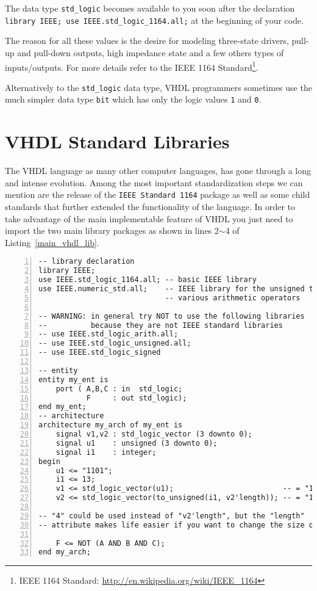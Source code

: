 The data type \texttt{std\_logic} becomes available to you soon after the declaration \texttt{library IEEE; use IEEE.std\_logic\_1164.all;} at the beginning of your code.

The reason for all these values is the desire for modeling three-state drivers, pull-up and pull-down outputs, high impedance state and a few others types of inputs/outputs. For more details refer to the IEEE 1164 Standard\footnote{IEEE 1164 Standard: \footnotesize\url{http://en.wikipedia.org/wiki/IEEE_1164}}.

Alternatively to the \texttt{std\_logic} data type, VHDL programmers sometimes use the much simpler data type \texttt{bit} which has only the logic values \texttt{1} and \texttt{0}.

\section{VHDL Standard Libraries}
The VHDL language as many other computer languages, has gone through a long and intense evolution. Among the most important standardization steps we can mention are the release of the \texttt{IEEE Standard 1164} package as well as some child standards that further extended the functionality of the language. In order to take advantage of the main implementable feature of VHDL you just need to import the two main library packages as shown in lines 2$\sim$4 of Listing~\ref{main_vhdl_lib}.

\noindent
\begin{minipage}{0.99\linewidth}
\begin{lstlisting}[numbers=left,label=main_vhdl_lib, caption=Typical inclusions of IEEE standard libraries.]
-- library declaration
library IEEE;
use IEEE.std_logic_1164.all; -- basic IEEE library
use IEEE.numeric_std.all;    -- IEEE library for the unsigned type and
                             -- various arithmetic operators

-- WARNING: in general try NOT to use the following libraries
--          because they are not IEEE standard libraries
-- use IEEE.std_logic_arith.all;
-- use IEEE.std_logic_unsigned.all;
-- use IEEE.std_logic_signed

-- entity
entity my_ent is
	port ( A,B,C : in  std_logic;
	       F     : out std_logic);
end my_ent;
-- architecture
architecture my_arch of my_ent is
    signal v1,v2 : std_logic_vector (3 downto 0);
    signal u1    : unsigned (3 downto 0);
    signal i1    : integer;
begin
    u1 <= "1101";
    i1 <= 13;
    v1 <= std_logic_vector(u1);                         -- = "1101"
    v2 <= std_logic_vector(to_unsigned(i1, v2'length)); -- = "1101"

-- "4" could be used instead of "v2'length", but the "length"
-- attribute makes life easier if you want to change the size of v2

	F <= NOT (A AND B AND C);
end my_arch;
\end{lstlisting}
\end{minipage}

